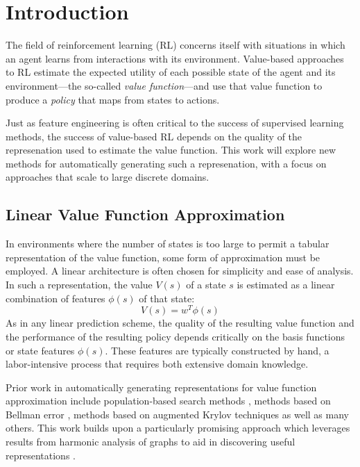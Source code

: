 \section{Introduction}

The field of reinforcement learning (RL) concerns itself with situations in
which an agent learns from interactions with its environment. Value-based
approaches to RL estimate the expected utility of each possible state of the
agent and its environment---the so-called \emph{value function}---and use that
value function to produce a \emph{policy} that maps from states to actions.

Just as feature engineering is often critical to the success of supervised
learning methods, the success of value-based RL depends on the quality of the
represenation used to estimate the value function. This work will explore new
methods for automatically generating such a represenation, with a focus on
approaches that scale to large discrete domains.

\subsection{Linear Value Function Approximation}

In environments where the number of states is too large to permit a tabular
representation of the value function, some form of approximation must be
employed. A linear architecture is often chosen for simplicity and ease of
analysis. In such a representation, the value $V(s)$ of a state $s$ is
estimated as a linear combination of features $\phi(s)$ of that state:
%
\begin{equation}
V(s) = w^{T}\phi(s)
\end{equation}
%
As in any linear prediction scheme, the quality of the resulting value function
and the performance of the resulting policy depends critically on the basis
functions or state features $\phi(s)$. These features are typically constructed
by hand, a labor-intensive process that requires both extensive domain
knowledge.

Prior work in automatically generating representations for value function 
approximation include population-based search methods 
\citep{whiteson2006evolutionary}, methods based on Bellman
error \citep{parr2007analyzing}, methods based on augmented Krylov techniques 
\citep{petrik2007analysis} as well as many others. This work builds upon
a particularly promising approach which leverages results from harmonic analysis
of graphs to aid in discovering useful representations 
\citep{Mahadevan2006Value,Coifman06Diffusion,Wang2009Multiscale}.

